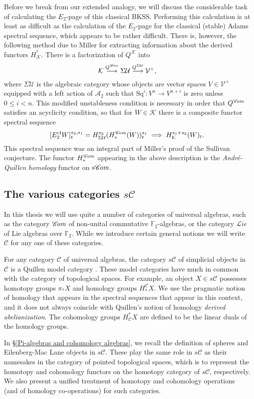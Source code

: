 \documentclass[11pt]{amsart} \renewcommand{\baselinestretch}{1.2}
\theoremstyle{plain}
\numberwithin{equation}{section} %
\theoremstyle{plain}
\numberwithin{equation}{chapter} %
\renewcommand{\to}{\longrightarrow}
\newcommand{\scrL}{\mathscr{L}}
\newcommand{\scrC}{\mathscr{C}}
\newcommand{\calV}{\mathcal{V}}
\newcommand{\calu}{\mathcal{U}}
\newcommand{\cala}{\mathcal{A}}
\newcommand{\calk}{\mathcal{K}}
\newcommand{\calc}{\mathcal{C}}
\newcommand{\vect}[2]{\calV^{#1}_{#2}}
\newcommand{\Sq}{\mathrm{Sq}}
\newcommand{\F}{\mathbb{F}}
\newcommand{\algs}{{\scrC\!\textit{\normalfont\textit{om}}}}
\newcommand{\liealgs}{{\scrL\!\textit{ie}}}
\newcommand{\Ftwo}{\F_2}
\newcommand{\E}[5]{[E^{#1}_{#2}#3]^{#4}_{#5}}
\newcommand{\BKSS}{BKSS}
\newcommand{\SubsectionOrSection}[1]{\subsection{#1}}
\begin{document}
\begin{Introduction}
Before we break from our extended analogy, we will discuss the considerable task of calculating the $E_2$-page of this classical \BKSS. Performing this calculation is at least as difficult as the calculation of the $E_2$-page for the classical (stable) Adams spectral sequence, which appears to be rather difficult. There is, however, the following method due to Miller \cite{MillerSullivanConjecture.pdf} for extracting information about the derived functors $H^*_{\calk}$. There is a factorization of $Q^{\calk}$ into 
\[\calk\overset{Q^{\algs}}{\to} \Sigma\calu \overset{Q^{\Sigma\calu}}{\to}\vect{+}{},\]
where $\Sigma\calu$ is the algebraic category whose objects are vector spaces $V\in\vect{+}{}$ equipped with a left action of $\cala_2$ such that $\Sq^i:V^n\to V^{n+i}$ is zero unless $0\leq i <n$.
This modified unstableness condition is necessary in order that $Q^\algs$ satisfies an acyclicity condition, so that for $W\in\calk$ there is a composite functor spectral sequence
\[\E{\textup{cf}}{2}{W}{s_2,s_1}{t}=H^{s_2}_{\Sigma\calu}(H_*^{\algs}(W))^{s_1}_t\implies H^{s_1+s_2}_\calk (W)_t.\]
This spectral sequence was an integral part of Miller's proof of the Sullivan conjecture. The functor $H_*^{\algs}$ appearing in the above description is the \emph{Andr\'e-Quillen  homology} functor on $s\algs$. 

\SubsectionOrSection{The various categories $s\calc$}
\label{various categories sc}
In this thesis we will use quite a number of categories of universal algebras, such as the category $\algs$ of non-unital commutative $\Ftwo$-algebras, or the category $\liealgs$ of Lie algebras over $\Ftwo$. While we introduce certain general notions we will write $\calc$ for any one of these categories.

For any category $\calc $ of universal algebras, the category $s\calc$ of simplicial objects in $\calc$ is a Quillen model category \cite{QuillenHomAlg.pdf}. These model categories have much in common with the category of topological spaces. For example, an  object $X\in s\calc$ possesses homotopy groups $\pi_*X$ and homology groups $H_*^{\calc}X$. We use the  pragmatic notion of homology that appears in the spectral sequences that appear in this context, and it does not always coincide with Quillen's notion of homology \emph{derived abelianization}. The cohomology groups $H^*_{\calc}X$ are defined to be the linear duals of the homology groups.

In \S\ref{Pi-algebras and cohomology algebras}, we recall the  definition of  spheres and Eilenberg-Mac Lane objects in $s\calc$. These play the same role in $s\calc$ as their namesakes in the category of pointed topological spaces, which is to represent the homotopy and cohomology functors on the homotopy category of $s\calc$, respectively.
We also present a unified treatment of homotopy and cohomology operations (and of homology co-operations) for such categories. 


\end{Introduction}
\end{document}

